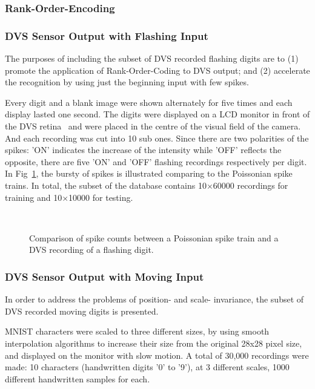 	\subsubsection{Rank-Order-Encoding}
  
	\subsubsection{DVS Sensor Output with Flashing Input}
	The purposes of including the subset of DVS recorded flashing digits are to (1) promote the application of Rank-Order-Coding to DVS output; and (2) accelerate the recognition by using just the beginning input with few spikes.
	
	Every digit and a blank image were shown alternately for five times and each display lasted one second.
	The digits were displayed on a LCD monitor in front of the DVS retina~\cite{serrano-gotarredona_128_2013} and were placed in the centre of the visual field of the camera.
	And each recording was cut into 10 sub ones.
	Since there are two polarities of the spikes: 'ON' indicates the increase of the intensity while 'OFF' reflects the opposite, there are five 'ON' and 'OFF' flashing recordings respectively per digit.
	In Fig~\ref{fig:count}, the bursty of spikes is illustrated comparing to the Poissonian spike trains.
	In total, the subset of the database contains 10$\times$60000 recordings for training and 10$\times$10000 for testing.
	\begin{figure}[b!]
	  \centering
	  \\

	  \caption{Comparison of spike counts between a Poissonian spike train and a DVS recording of a flashing digit.}
	  \label{fig:count}
	\end{figure}
	\subsubsection{DVS Sensor Output with Moving Input}
	In order to address the problems of position- and scale- invariance, the subset of DVS recorded moving digits is presented.
	
	MNIST characters were scaled to three different sizes, by using smooth interpolation algorithms to increase their size from the original 28x28 pixel size, and displayed on the monitor with slow motion. 
	A total of 30,000 recordings were made: 10 characters (handwritten digits '0' to '9'), at 3 different scales, 1000 different handwritten samples for each.